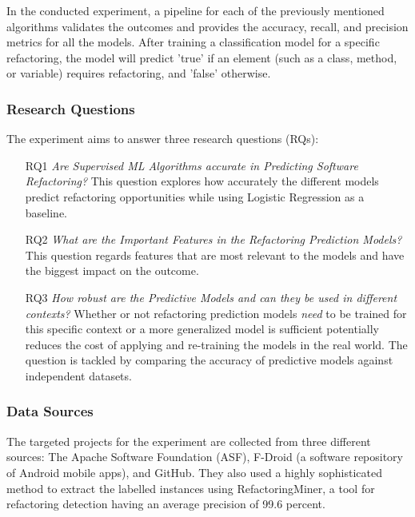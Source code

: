 In the conducted experiment, a pipeline for each of the previously mentioned algorithms validates the outcomes and provides the accuracy, recall, and precision metrics for all the models. After training a classification model for a specific refactoring, the model will predict 'true' if an element (such as a class, method, or variable) requires refactoring, and 'false' otherwise.
\subsubsection{Research Questions}
The experiment aims to answer three research questions (RQs):
\begin{itemize}
    \item[RQ1] \textit{Are Supervised ML Algorithms accurate in Predicting Software Refactoring?} This question explores how accurately the different models predict refactoring opportunities while using Logistic Regression as a baseline.
    \item[RQ2] \textit{What are the Important Features in the Refactoring Prediction Models?} This question regards features that are most relevant to the models and have the biggest impact on the outcome.
    \item[RQ3] \textit{How robust are the Predictive Models and can they be used in different contexts?} Whether or not refactoring prediction models \textit{need} to be trained for this specific context or a more generalized model is sufficient potentially reduces the cost of applying and re-training the models in the real world. The question is tackled by comparing the accuracy of predictive models against independent datasets.
\end{itemize}
\subsubsection{Data Sources}
The targeted projects for the experiment are collected from three different sources: The Apache Software Foundation (ASF), F-Droid (a software repository of Android mobile apps), and GitHub. They also used a highly sophisticated method to extract the labelled instances using RefactoringMiner\cite{tsantalis2018accurate}, a tool for refactoring detection having an average precision of 99.6 percent\cite{tsantalis2022refactoringminer}.
